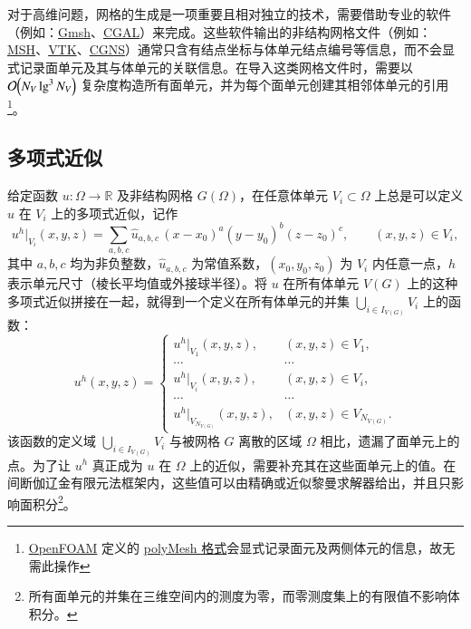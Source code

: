 对于高维问题，网格的生成是一项重要且相对独立的技术，需要借助专业的软件（例如：\href{http://gmsh.info/}{Gmsh}、\href{https://www.cgal.org/}{CGAL}）来完成。这些软件输出的非结构网格文件（例如：\href{http://gmsh.info/doc/texinfo/gmsh.html\#File-formats}{MSH}、\href{https://www.vtk.org/wp-content/uploads/2015/04/file-formats.pdf}{VTK}、\href{http://cgns.github.io/}{CGNS}）通常只含有结点坐标与体单元结点编号等信息，而不会显式记录面单元及其与体单元的关联信息。在导入这类网格文件时，需要以
$\order{N_{V}\lg^{3}N_{V}}$ 复杂度构造所有面单元，并为每个面单元创建其相邻体单元的引用\footnote{\href{https://www.openfoam.com}{OpenFOAM} 定义的 \href{https://www.openfoam.com/documentation/user-guide/4-mesh-generation-and-conversion/4.1-mesh-description}{polyMesh 格式}会显式记录面元及两侧体元的信息，故无需此操作}。

\newpage{}

\subsection{多项式近似}

给定函数 $u\colon\varOmega\to\mathbb{R}$ 及非结构网格 $G(\varOmega)$，在任意体单元
$V_{i}\subset\varOmega$ 上总是可以定义 $u$ 在 $V_{i}$ 上的多项式近似，记作
\begin{equation}
u^{h}|_{V_{i}}(x,y,z)=\sum_{a,b,c}\hat{u}_{a,b,c}\,(x-x_{0})^{a}(y-y_{0})^{b}(z-z_{0})^{c},\qquad(x,y,z)\in V_{i},
\end{equation}
其中 $a,b,c$ 均为非负整数，$\hat{u}_{a,b,c}$ 为常值系数，$(x_{0},y_{0},z_{0})$
为 $V_{i}$ 内任意一点，$h$ 表示单元尺寸（棱长平均值或外接球半径）。将
$u$ 在所有体单元 $V(G)$ 上的这种多项式近似拼接在一起，就得到一个定义在所有体单元的并集 $\bigcup_{i\in I_{V(G)}}V_{i}$
上的函数：
\begin{equation}
u^{h}(x,y,z)=\begin{cases}
u^{h}|_{V_{1}}(x,y,z), & (x,y,z)\in V_{1},\\
\cdots & \cdots\\
u^{h}|_{V_{i}}(x,y,z), & (x,y,z)\in V_{i},\\
\cdots & \cdots\\
u^{h}|_{V_{N_{V(G)}}}(x,y,z), & (x,y,z)\in V_{N_{V(G)}}.
\end{cases}\label{eq:piecewise_polynomial}
\end{equation}
该函数的定义域 $\bigcup_{i\in I_{V(G)}}V_{i}$ 与被网格 $G$ 离散的区域 $\varOmega$
相比，遗漏了面单元上的点。为了让 $u^{h}$ 真正成为 $u$ 在 $\varOmega$ 上的近似，需要补充其在这些面单元上的值。在间断伽辽金有限元法框架内，这些值可以由精确或近似黎曼求解器给出，并且只影响面积分\footnote{所有面单元的并集在三维空间内的测度为零，而零测度集上的有限值不影响体积分。}。


